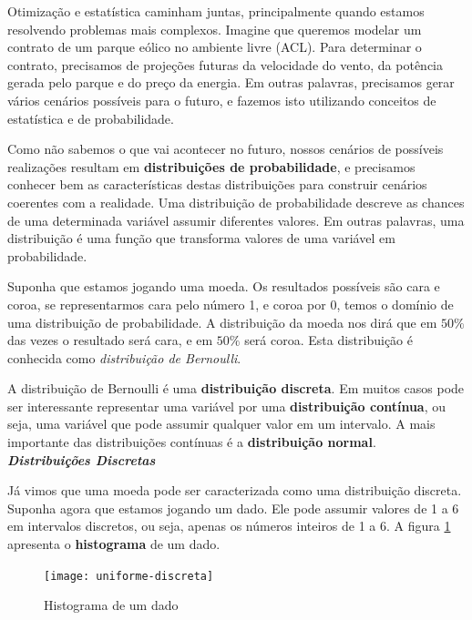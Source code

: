Otimização e estatística caminham juntas, principalmente quando estamos resolvendo problemas mais complexos. Imagine que queremos modelar um contrato de um parque eólico no ambiente livre (ACL). Para determinar o contrato, precisamos de projeções futuras da velocidade do vento, da potência gerada pelo parque e do preço da energia. Em outras palavras, precisamos gerar vários cenários possíveis para o futuro, e fazemos isto utilizando conceitos de estatística e de probabilidade. 

Como não sabemos o que vai acontecer no futuro, nossos cenários de possíveis realizações resultam em \textbf{distribuições de probabilidade}, e precisamos conhecer bem as características destas distribuições para construir cenários coerentes com a realidade. Uma distribuição de probabilidade descreve as chances de uma determinada variável assumir diferentes valores. Em outras palavras, uma distribuição é uma função que transforma valores de uma variável em probabilidade. 

Suponha que estamos jogando uma moeda. Os resultados possíveis são cara e coroa, se representarmos cara pelo número 1, e coroa por 0, temos o domínio de uma distribuição de probabilidade. A distribuição da moeda nos dirá que em $50\%$ das vezes o resultado será cara, e em $50\%$ será coroa. Esta distribuição é conhecida como \textit{distribuição de Bernoulli}.

A distribuição de Bernoulli é uma \textbf{distribuição discreta}. Em muitos casos pode ser interessante representar uma variável por uma \textbf{distribuição contínua}, ou seja, uma variável que pode assumir qualquer valor em um intervalo. A mais importante das distribuições contínuas é a \textbf{distribuição normal}. 
\\

\textbf{\textit{Distribuições Discretas}}


Já vimos que uma moeda pode ser caracterizada como uma distribuição discreta. Suponha agora que estamos jogando um dado. Ele pode assumir valores de 1 a 6 em intervalos discretos, ou seja, apenas os números inteiros de 1 a 6. A figura \ref{fig:prob1} apresenta o \textbf{histograma} de um dado. 

\begin{figure}[H]
\begin{centering}
\texttt{[image: uniforme-discreta]}\protect\caption{\label{fig:prob1}Histograma de um dado}
\end{centering}
\end{figure}


